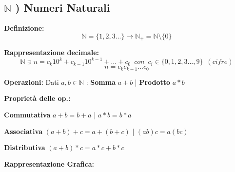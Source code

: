 \documentclass[10pt, oneside]{book}
\theoremstyle{plain}
\begin{document}
    \subsection*{$\mathbb{N}$ ) Numeri Naturali}
        \begin{description}
            \item \textbf{Definizione: } \[\mathbb{N} = \{1,2,3...\} \longrightarrow \mathbb{N}_+ = \mathbb{N} \setminus \{0\}\]
            \item \textbf{Rappresentazione decimale: }  \[\mathbb{N} \owns n = c_k 10^k + c_{k-1} 10^{k-1} + ... + c_0 \enspace{} {con} \enspace{} c_i \in \{0,1,2,3...,9\}\enspace{} {(cifre)}\]
            \[n = c_k c_{k-1} ... c_0\]
            \item \textbf{Operazioni: } Dati $a, b \in \mathbb{N}$ : \textbf{Somma} $a + b$ | \textbf{Prodotto} $a*b$
            \item \textbf{Proprietà delle op.:}
                \begin{description}
                    \item \textbf{Commutativa} $a + b = b + a$ | $a*b = b*a$
                    \item \textbf{Associativa} $(a + b) + c = a + (b + c)$ | $(a b) c = a (b c)$
                    \item \textbf{Distributiva} $(a + b)*c = a*c + b*c$
                \end{description}
            \item \textbf{Rappresentazione Grafica: }
            \item
            \item 
\end{description}
\end{document}
